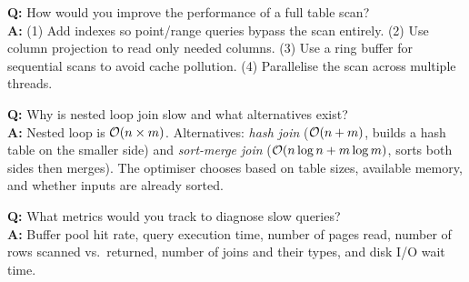 \begin{interviewbox}
\textbf{Q:} How would you improve the performance of a full table scan?\\[4pt]
\textbf{A:} (1) Add indexes so point/range queries bypass the scan entirely.  (2) Use column projection to read only needed columns.  (3) Use a ring buffer for sequential scans to avoid cache pollution.  (4) Parallelise the scan across multiple threads.

\vspace{6pt}
\textbf{Q:} Why is nested loop join slow and what alternatives exist?\\[4pt]
\textbf{A:} Nested loop is $\mathcal{O}(n \times m)$.  Alternatives: \emph{hash join} ($\mathcal{O}(n + m)$, builds a hash table on the smaller side) and \emph{sort-merge join} ($\mathcal{O}(n\log n + m\log m)$, sorts both sides then merges).  The optimiser chooses based on table sizes, available memory, and whether inputs are already sorted.

\vspace{6pt}
\textbf{Q:} What metrics would you track to diagnose slow queries?\\[4pt]
\textbf{A:} Buffer pool hit rate, query execution time, number of pages read, number of rows scanned vs.\ returned, number of joins and their types, and disk I/O wait time.
\end{interviewbox}
